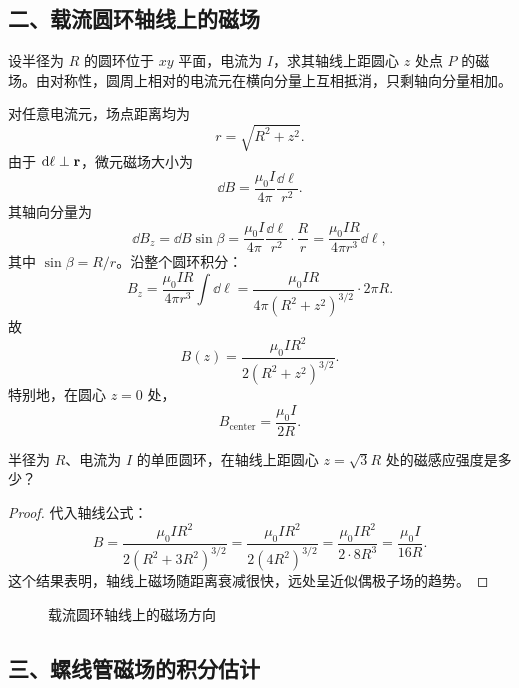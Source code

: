 \subsection*{二、载流圆环轴线上的磁场}

设半径为 $R$ 的圆环位于 $xy$ 平面，电流为 $I$，求其轴线上距圆心 $z$ 处点 $P$ 的磁场。由对称性，圆周上相对的电流元在横向分量上互相抵消，只剩轴向分量相加。

对任意电流元，场点距离均为
\[
  r=\sqrt{R^2+z^2}.
\]
由于 $\dd\vb{\ell}\perp\vb{r}$，微元磁场大小为
\[
  \dd B=\frac{\mu_0 I}{4\pi}\frac{\dd\ell}{r^2}.
\]
其轴向分量为
\[
  \dd B_z=\dd B\sin\beta
  =\frac{\mu_0 I}{4\pi}\frac{\dd\ell}{r^2}\cdot\frac{R}{r}
  =\frac{\mu_0 I R}{4\pi r^3}\dd\ell,
\]
其中 $\sin\beta=R/r$。沿整个圆环积分：
\[
  B_z=\frac{\mu_0 I R}{4\pi r^3}\int \dd\ell
  =\frac{\mu_0 I R}{4\pi (R^2+z^2)^{3/2}}\cdot 2\pi R.
\]
故
\[
  B(z)=\frac{\mu_0 I R^2}{2(R^2+z^2)^{3/2}}.
\]
特别地，在圆心 $z=0$ 处，
\[
  B_\mathrm{center}=\frac{\mu_0 I}{2R}.
\]

\begin{example}
半径为 $R$、电流为 $I$ 的单匝圆环，在轴线上距圆心 $z=\sqrt{3}R$ 处的磁感应强度是多少？
\end{example}

\begin{proof}
代入轴线公式：
\[
  B=\frac{\mu_0 I R^2}{2(R^2+3R^2)^{3/2}}
  =\frac{\mu_0 I R^2}{2(4R^2)^{3/2}}
  =\frac{\mu_0 I R^2}{2\cdot 8R^3}
  =\frac{\mu_0 I}{16R}.
\]
这个结果表明，轴线上磁场随距离衰减很快，远处呈近似偶极子场的趋势。
\end{proof}

\begin{figure}[H]
\centering
{}
\caption{载流圆环轴线上的磁场方向}
\end{figure}

\subsection*{三、螺线管磁场的积分估计}

